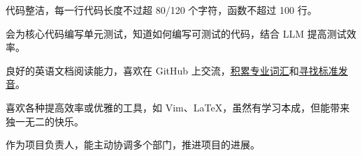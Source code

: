 

\begin{cventries}

  \cventry
    {} {} {} {}
    {
      \begin{cvitems}
        \item {代码整洁，每一行代码长度不过超 80/120 个字符，函数不超过 100 行。}
        \item {会为核⼼代码编写单元测试，知道如何编写可测试的代码，结合 LLM 提高测试效率。}
        \item {良好的英语文档阅读能力，喜欢在 GitHub 上交流，\href{https://www.kugarocks.com/zh-cn/linux/appendix/term-1/}{\uline{积累专业词汇}}和\href{https://www.kugarocks.com/zh-cn/linux/say-my-name/}{\uline{寻找标准发音}}。}
        \item {喜欢各种提高效率或优雅的工具，如 Vim、LaTeX，虽然有学习本成，但能带来独一无二的快乐。}
        \item {作为项⽬负责⼈，能主动协调多个部门，推进项⽬的进展。}
      \end{cvitems}
    }

\end{cventries}
